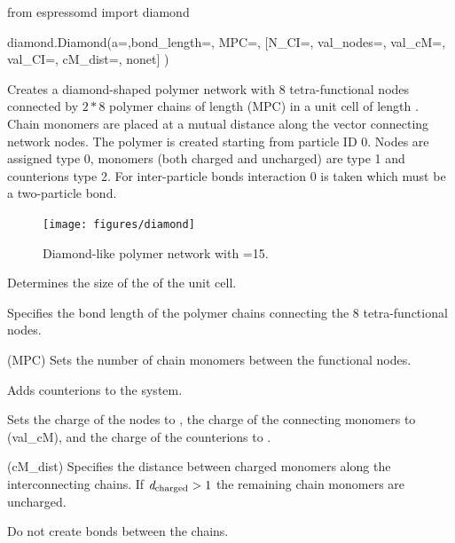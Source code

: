  \begin{pycode}
	from espressomd import diamond 
\end{pycode}

\begin{pysyntax}
	diamond.Diamond(a=,bond_length=, MPC=, [N_CI=, val_nodes=, val_cM=, val_CI=, cM_dist=, nonet] )
\end{pysyntax}

Creates a diamond-shaped polymer network with 8 tetra-functional nodes
connected by $2*8$ polymer chains of length  (MPC) in 
a unit cell of length . Chain monomers are placed at a mutual distance 
along the vector connecting network nodes.
The polymer is created starting from particle ID 0. Nodes are assigned type 0,
monomers (both charged and uncharged) are type 1 and counterions type 2.
For inter-particle bonds interaction $0$ is taken which must be a two-particle bond.

\begin{figure}[ht]
  \label{fig:diamond}
  \begin{center}
  \texttt{[image: figures/diamond]}
  \caption{Diamond-like polymer network with =15.}
  \end{center}
\end{figure}

\begin{arguments}
\item[\var{a}] Determines the size of the of the unit cell.
\item[\var{bond\_length}] Specifies the bond length of the polymer
  chains connecting the 8 tetra-functional nodes.
\item[\var{monomers\_per\_chain}] (MPC) Sets the number of chain monomers
  between the functional nodes.
\item[\opt{counterions \var{N_\mathrm{CI}}}] Adds 
  counterions to the system.
\item[\opt{charges \var{val_\mathrm{node}} \var{val_\mathrm{monomer}}
    \var{val_\mathrm{CI}}}] Sets the charge of the nodes to
  , the charge of the connecting monomers to
   (val\_cM), and the charge of the counterions to
  .
\item[\opt{distance \var{d_\mathrm{charged}}}] (cM\_dist) Specifies the distance
  between charged monomers along the interconnecting chains. If
  $\mathrm{\mathit{d_\mathrm{charged}}} > 1$ the remaining chain monomers are
  uncharged.
  \item[\opt{nonet}] Do not create bonds between the chains.
\end{arguments}


